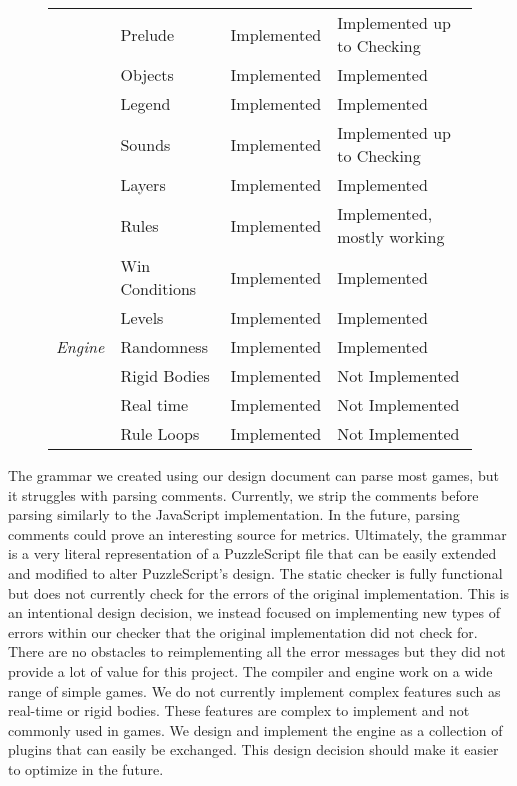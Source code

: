 \begin{figure}[!t]
\begin{tabular}{l|l|l|l}
             & Prelude           & Implemented               & Implemented up to Checking  \\
             & Objects           & Implemented               & Implemented                 \\
             & Legend            & Implemented               & Implemented                 \\
             & Sounds            & Implemented               & Implemented up to Checking  \\
             & Layers            & Implemented               & Implemented                 \\
             & Rules             & Implemented               & Implemented, mostly working \\
             & Win Conditions    & Implemented               & Implemented                 \\
             & Levels            & Implemented               & Implemented                 \\
    \textit{Engine}   & Randomness        & Implemented               & Implemented                 \\
             & Rigid Bodies      & Implemented               & Not Implemented             \\
             & Real time         & Implemented               & Not Implemented             \\
             & Rule Loops        & Implemented               & Not Implemented             \\
    \end{tabular}
    \label{fig:feature_comparison}
\end{figure}


The grammar we created using our design document can parse most games, but it struggles with parsing comments. Currently, we strip the comments before parsing similarly to the JavaScript implementation. In the future, parsing comments could prove an interesting source for metrics. Ultimately, the grammar is a very literal representation of a PuzzleScript file that can be easily extended and modified to alter PuzzleScript's design. The static checker is fully functional but does not currently check for the errors of the original implementation. This is an intentional design decision, we instead focused on implementing new types of errors within our checker that the original implementation did not check for. There are no obstacles to reimplementing all the error messages but they did not provide a lot of value for this project. The compiler and engine work on a wide range of simple games. We do not currently implement complex features such as real-time or rigid bodies. These features are complex to implement and not commonly used in games. We design and implement the engine as a collection of plugins that can easily be exchanged. This design decision should make it easier to optimize in the future.

